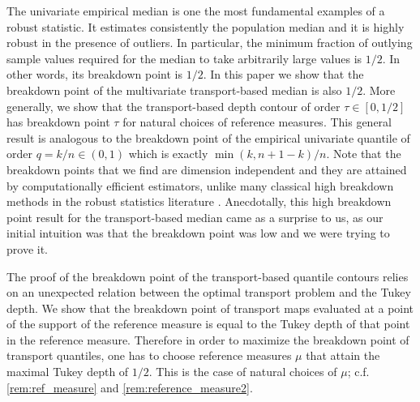\documentclass[11pt]{article}
\theoremstyle{plain}
\theoremstyle{definition}
\begin{document}
The univariate empirical median is one the most fundamental examples of a robust statistic. It estimates consistently the population median and it is highly robust in the presence of outliers. In particular, the minimum fraction of  {outlying} sample values required for the median to take arbitrarily large values is $1/2$. In other words, its breakdown point is $1/2$. In this paper we show that the breakdown point of the multivariate transport-based median is also $1/2$. More generally, we show that the transport-based depth contour of order $\tau\in [0,1/2]$ has breakdown point $\tau$ for natural choices of reference measures. This general result is analogous to the  breakdown point of the empirical univariate quantile of order \(q=k/n \in (0,1)\) which is exactly 
\( \min(k,n+1-k)/n\).  Note  that the breakdown points that we find are dimension independent and they are attained by computationally efficient estimators, unlike many classical high breakdown methods in the robust statistics literature \cite{maronna1976, davies1987,donoho:gasko1992,tyler1994,zuo2003}.  { Anecdotally, this high breakdown point result for the transport-based median came as a surprise to us, as our initial intuition was that the breakdown point was low and  we were trying to prove it. }


The proof of the breakdown point of the transport-based quantile contours relies on an unexpected relation between the optimal transport problem and the Tukey depth.  We show that the breakdown point of transport maps evaluated at a point of the support of the reference measure is equal to the Tukey depth of that point in the reference measure. Therefore in order to maximize the breakdown point of transport quantiles, one has to choose reference measures $\mu$ that attain the maximal Tukey depth of $1/2$. This is the case of natural choices of $\mu$; c.f. \autoref{rem:ref_measure} and \autoref{rem:reference_measure2}.
\end{document}
